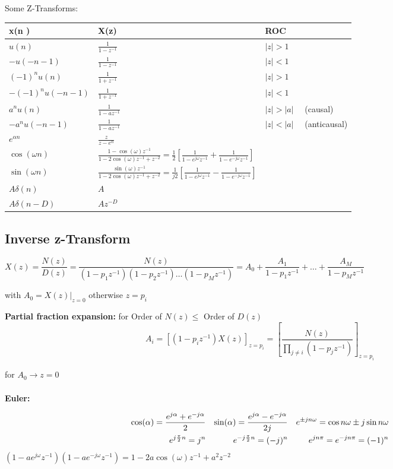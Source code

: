 Some Z-Transforms:\\
\begin{tabular}{|l|l|l|}
	\hline
	\textbf{x(n} ) & \textbf{X(z}) & \textbf{ROC} \\
	\hline
	$u(n)$ & $\frac{1}{1 - z^{-1}}$ & $|z|>1$ \\
	\hline
	$-u(-n-1)$ & $\frac{1}{1 - z^{-1}}$ & $|z|<1$ \\
	\hline
	$(-1)^n u(n)$ & $\frac{1}{1 + z^{-1}}$ & $|z|>1$ \\
	\hline
	$-(-1)^n u(-n-1)$ & $\frac{1}{1 + z^{-1}}$ & $|z|<1$ \\
	\hline
	$a^n u(n)$ & $\frac{1}{1 - az^{-1}}$ & $|z|>|a| \quad$ (causal) \\
	\hline
	$-a^n u(-n-1)$ & $\frac{1}{1 - az^{-1}}$ & $|z|<|a| \quad$ (anticausal) \\
	\hline
	$e^{\alpha n}$ & $\frac{z}{z-e^{\alpha}}$ & \\
	\hline
	$\cos(\omega n)$ & $\frac{1-\cos(\omega)z^{-1}}{1-2\cos(\omega)z^{-1}+z^{-2}}
	 = \frac{1}{2}\left[\frac{1}{1-e^{j\omega}z^{-1}}+ \frac{1}{1-e^{-j\omega}z^{-1}}\right]$ & \\
	\hline
	$\sin(\omega n)$ & $\frac{\sin(\omega)z^{-1}}{1-2\cos(\omega)z^{-1}+z^{-2}}
  = \frac{1}{j2}\left[\frac{1}{1-e^{j\omega}z^{-1}}- \frac{1}{1-e^{-j\omega}z^{-1}}\right]$ & \\
	\hline
	$A\delta(n)$ & $A$ & \\
	\hline
	$A\delta(n-D)$ & $Az^{-D}$ & \\
	\hline
\end{tabular}


\subsection{Inverse z-Transform}

$X(z) = \dfrac{N(z)}{D(z)} = \dfrac{N(z)}{(1-p_1z^{-1})(1-p_2z^{-1})\ldots(1-p_Mz^{-1})} = 
A_0 + \dfrac{A_1}{1-p_1z^{-1}} + \ldots + \dfrac{A_M}{1-p_Mz^{-1}}$

with $A_0 = X(z)|_{z=0}$ otherwise $z = p_i$

\textbf{Partial fraction expansion:} for Order of $N(z) \leq$ Order of $D(z)$ \\
\[A_i = [(1-p_iz^{-1})X(z)]_{z=p_i} = \left[\frac{N(z)}{\prod\limits_{j\neq i}(1-p_jz^{-1})}\right]_{z=p_i}\]

for $A_0 \rightarrow z=0$\\ \\

\textbf{Euler:}

\begin{align}
\cos(\alpha) = \frac{e^{j\alpha} + e^{-j\alpha}}{2}
&& \sin(\alpha) = \frac{e^{j\alpha} - e^{-j\alpha}}{2j} && 
    {e}^{\pm jn\omega} = \cos{n\omega} \pm j \sin{n\omega} \notag\\
e^{j\frac{\pi}{2}n} = j^n & & e^{-j\frac{\pi}{2}n} = (-j)^n &&
e^{jn\pi}=e^{-jn\pi}=(-1)^n \notag
\end{align}
$(1-ae^{j\omega}z^{-1})(1-ae^{-j\omega}z^{-1}) = 1 - 2a\cos(\omega)z^{-1}+a^2z^{-2}$


